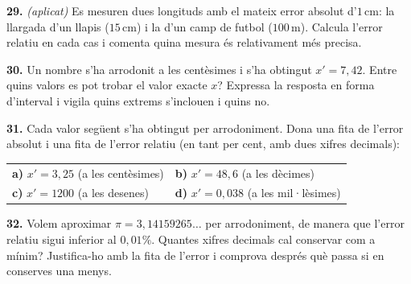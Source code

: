 \documentclass[13pt,a4paper]{extarticle}
\begin{document}
\par\noindent\begin{minipage}{\linewidth}
\textbf{29.} \emph{(aplicat)} Es mesuren dues longituds amb el mateix error absolut d'$1\,\text{cm}$: la llargada d'un llapis ($15\,\text{cm}$) i la d'un camp de futbol ($100\,\text{m}$). Calcula l'error relatiu en cada cas i comenta quina mesura és relativament més precisa.\par
\end{minipage}\par\vspace{1.6mm}
\par\noindent\begin{minipage}{\linewidth}
\textbf{30.} Un nombre s'ha arrodonit a les centèsimes i s'ha obtingut $x'=7{,}42$. Entre quins valors es pot trobar el valor exacte $x$? Expressa la resposta en forma d'interval i vigila quins extrems s'inclouen i quins no.\par
\end{minipage}\par\vspace{1.6mm}
\par\noindent\begin{minipage}{\linewidth}
\textbf{31.} Cada valor següent s'ha obtingut per arrodoniment. Dona una fita de l'error absolut i una fita de l'error relatiu (en tant per cent, amb dues xifres decimals):\par

\begin{tabular}{@{}p{.46\linewidth}p{.46\linewidth}@{}}
\textbf{a)} $x'=3{,}25$ (a les centèsimes) & \textbf{b)} $x'=48{,}6$ (a les dècimes) \\[2pt]
\textbf{c)} $x'=1200$ (a les desenes) & \textbf{d)} $x'=0{,}038$ (a les mil·lèsimes) \\[2pt]
\end{tabular}\par
\end{minipage}\par\vspace{1.6mm}
\par\noindent\begin{minipage}{\linewidth}
\textbf{32.} Volem aproximar $\pi=3{,}14159265\ldots$ per arrodoniment, de manera que l'error relatiu sigui inferior al $0{,}01\%$. Quantes xifres decimals cal conservar com a mínim? Justifica-ho amb la fita de l'error i comprova després què passa si en conserves una menys.\par
\end{minipage}\par\vspace{1.6mm}
\end{document}
